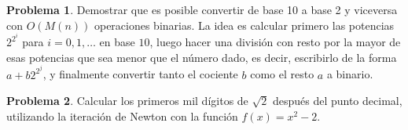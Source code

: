 \documentclass[a4paper, 11pt]{article}
\newcounter{numerodetema}
\theoremstyle{plain}
\theoremstyle{definition}
\newtheorem{prob}{Problema}[numerodetema]
\begin{document}
\begin{prob}
Demostrar que es posible convertir de base 10 a base 2 y viceversa con
$O(M(n))$ operaciones binarias. La idea es calcular primero las potencias
$2^{2^i}$ para $i=0,1,\ldots$ en base $10$, luego hacer una división con
resto por la mayor de esas potencias que sea menor que el número dado,
es decir, escribirlo de la forma $a+b2^{2^j}$, y finalmente convertir
tanto el cociente $b$ como el resto $a$ a binario.
\end{prob}

\begin{prob}
Calcular los primeros mil dígitos de $\sqrt{2}$ después del punto decimal,
utilizando la iteración de Newton con la función $f(x)=x^2-2$.
\end{prob}

\end{document}
